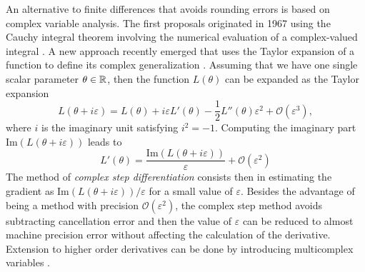 An alternative to finite differences that avoids rounding errors is based on complex variable analysis. 
The first proposals originated in 1967 using the Cauchy integral theorem involving the numerical evaluation of a complex-valued integral \cite{Lyness_1967, Lyness_Moler_1967}.
A new approach recently emerged that uses the Taylor expansion of a function to define its complex generalization \cite{Squire_Trapp_1998_complex_diff, Martins_Sturdza_Alonso_2003_complex_differentiation}. 
Assuming that we have one single scalar parameter $\theta \in \operatorname{\mathbb{R}}$, then the function $L(\theta)$ can be expanded as 
the Taylor expansion
\begin{equation}
    L(\theta + i \varepsilon)
    = 
    L(\theta) + i \varepsilon L'(\theta) 
    - 
    \frac 1 2
    L''(\theta) \varepsilon^2
    + 
    \mathcal O (\varepsilon^3),
\end{equation}
where $i$ is the imaginary unit satisfying $i^2 = -1$. 
Computing the imaginary part $\text{Im}(L(\theta + i \varepsilon))$ leads to
\begin{equation}
    L'(\theta) 
    = 
    \frac{\text{Im}(L(\theta + i \varepsilon))}{\varepsilon}
    + 
    \mathcal{O} (\varepsilon^2)
\end{equation}
The method of \textit{complex step differentiation} consists then in estimating the gradient as $\text{Im}(L(\theta + i \varepsilon)) / \varepsilon$ for a small value of $\varepsilon$. 
Besides the advantage of being a method with precision $\mathcal{O}(\varepsilon^2)$, the complex step method avoids subtracting cancellation error and then the value of $\varepsilon$ can be reduced to almost machine precision error without affecting the calculation of the derivative. 
Extension to higher order derivatives can be done by introducing multicomplex variables \cite{Lantoine_Russell_Dargent_2012}. 